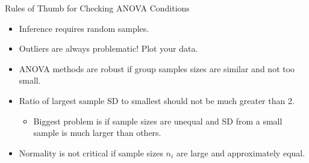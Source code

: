 \documentclass[t,xcolor=pdftex,dvipsnames,table,handout]{beamer}
\newcommand{\bi}{\begin{itemize}}
\newcommand{\ei}{\end{itemize}}
\begin{document}
\begin{frame}{Rules of Thumb for Checking ANOVA Conditions}
\bi
    \item Inference requires \alert{random samples}.\pause
    \item \alert{Outliers} are always problematic! Plot your data.
    \pause
    \item ANOVA methods are robust if group samples sizes are \alert{similar and
    not too small}. \pause
    \item Ratio of largest sample SD to smallest should not be much
    greater than \alert{2}. \pause
    \bi
        \item Biggest \alert{problem} is if sample sizes are \alert{unequal} and SD
        from a small sample is \alert{much larger} than others.
    \ei
    \pause
    \item Normality is not critical if sample sizes $n_i$ are
    \alert{large} and approximately \alert{equal}.
\ei
\end{frame}

\end{document}
